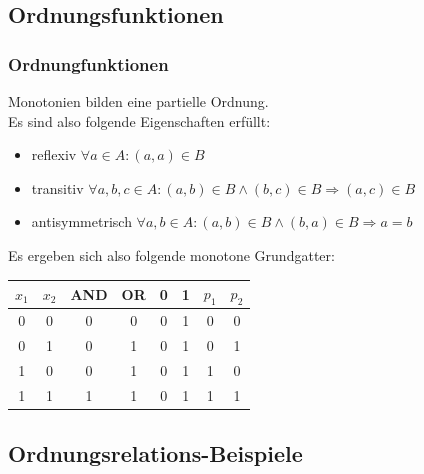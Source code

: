 \documentclass[hyperref={pdfpagelabels=false}]{beamer} %
\begin{document}
\subsection{Ordnungsfunktionen}
\begin{frame}%
 \frametitle{Ordnungfunktionen}
Monotonien bilden eine partielle Ordnung.\\ Es sind also folgende Eigenschaften erfüllt:\\
\begin{itemize}
 \item reflexiv $\forall a \in A: (a,a) \in B$\\
 \item transitiv $\forall a,b,c \in A: (a,b) \in B \land (b,c) \in B \Rightarrow (a,c) \in B$\\
 \item antisymmetrisch $\forall a,b \in A: (a,b) \in B \land (b,a) \in B \Rightarrow a=b$\\
\end{itemize}
 Es ergeben sich also folgende monotone Grundgatter:\\
\begin{tabular}[t]{|cc|c|c|c|c|c|c|} \hline
 $x_1$	& $x_2$	& AND	& OR	& 0	& 1	& $p_1$	& $p_2$\\ \hline
 0	& 0	& 0	& 0	& 0	& 1	& 0	& 0\\
 0	& 1	& 0	& 1	& 0	& 1	& 0	& 1\\
 1	& 0	& 0	& 1	& 0	& 1	& 1	& 0\\
 1	& 1	& 1	& 1	& 0	& 1	& 1	& 1\\ \hline
\end{tabular}
\end{frame}

\subsection{Ordnungsrelations-Beispiele}
\end{document}
